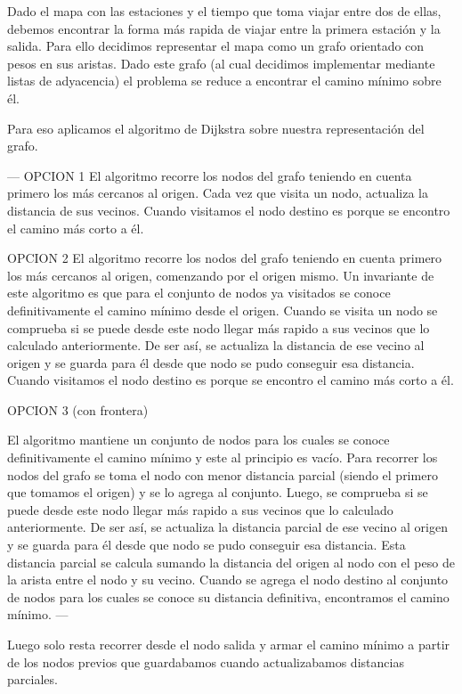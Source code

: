 Dado el mapa con las estaciones y el tiempo que toma viajar entre dos de ellas, debemos encontrar la forma más rapida de viajar entre la primera estación y la salida. Para ello decidimos representar el mapa como un grafo orientado con pesos en sus aristas. Dado este grafo (al cual decidimos implementar mediante listas de adyacencia) el problema se reduce a encontrar el camino mínimo sobre él.

Para eso aplicamos el algoritmo de Dijkstra sobre nuestra representación del grafo. 

---
OPCION 1
El algoritmo recorre los nodos del grafo teniendo en cuenta primero los más cercanos al origen. Cada vez que visita un nodo, actualiza la distancia de sus vecinos. Cuando visitamos el nodo destino es porque se encontro el camino más corto a él.

OPCION 2 %
El algoritmo recorre los nodos del grafo teniendo en cuenta primero los más cercanos al origen, comenzando por el origen mismo. Un invariante de este algoritmo es que para el conjunto de nodos ya visitados se conoce definitivamente el camino mínimo desde el origen. Cuando se visita un nodo se comprueba si se puede desde este nodo llegar más rapido a sus vecinos que lo calculado anteriormente. De ser así, se actualiza la distancia de ese vecino al origen y se guarda para él desde que nodo se pudo conseguir esa distancia. Cuando visitamos el nodo destino es porque se encontro el camino más corto a él.

OPCION 3 (con frontera)

El algoritmo mantiene un conjunto de nodos para los cuales se conoce definitivamente el camino mínimo y este al principio es vacío. Para recorrer los nodos del grafo se toma el nodo con menor distancia parcial (siendo el primero que tomamos el origen) y se lo agrega al conjunto. Luego, se comprueba si se puede desde este nodo llegar más rapido a sus vecinos que lo calculado anteriormente. De ser así, se actualiza la distancia parcial de ese vecino al origen y se guarda para él desde que nodo se pudo conseguir esa distancia. Esta distancia parcial se calcula sumando la distancia del origen al nodo con el peso de la arista entre el nodo y su vecino. Cuando se agrega el nodo destino al conjunto de nodos para los cuales se conoce su distancia definitiva, encontramos el camino mínimo.
---

Luego solo resta recorrer desde el nodo salida y armar el camino mínimo a partir de los nodos previos que guardabamos cuando actualizabamos distancias parciales.